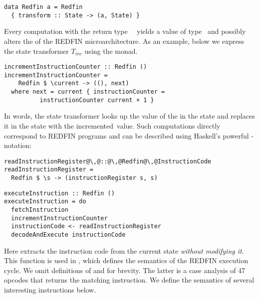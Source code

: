 \begin{verbatim}
data Redfin a = Redfin
  { transform :: State -> (a, State) }
\end{verbatim}

\noindent
Every computation with the return type~~ yields a value of type~
and possibly alters the  of the REDFIN microarchitecture. As an example,
below we express the state transformer $T_\textit{inc}$ using the  monad.

\begin{verbatim}
incrementInstructionCounter :: Redfin ()
incrementInstructionCounter =
    Redfin $ \current -> ((), next)
  where next = current { instructionCounter =
          instructionCounter current + 1 }
\end{verbatim}

\noindent
In words, the state transformer looks up the value of the 
in the  state and replaces it in the  state with the
incremented~value. Such computations directly correspond to REDFIN programs and
can be described using Haskell's powerful -notation:



\begin{verbatim}
readInstructionRegister@\,@::@\,@Redfin@\,@InstructionCode
readInstructionRegister =
  Redfin $ \s -> (instructionRegister s, s)
\end{verbatim}
\vspace{0.5mm}
\begin{verbatim}
executeInstruction :: Redfin ()
executeInstruction = do
  fetchInstruction
  incrementInstructionCounter
  instructionCode <- readInstructionRegister
  decodeAndExecute instructionCode
\end{verbatim}

\noindent
Here  extracts the instruction code from the current
state \emph{without modifying it}. This function is used in ,
which defines the semantics of the REDFIN execution cycle. We omit definitions of
 and  for brevity. The latter is a
case analysis of 47 opcodes that returns the matching instruction. We define the
semantics of several interesting instructions below.

